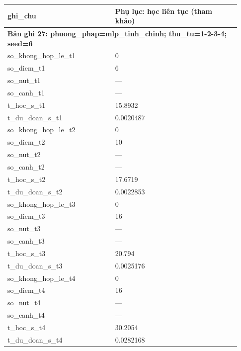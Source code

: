 \begin{longtable}{p{0.43\linewidth}p{0.50\linewidth}}
ghi\_\allowbreak chu & Phụ lục: học liên tục (tham khảo) \\
\midrule
\multicolumn{2}{p{0.95\linewidth}}{\textbf{Bản ghi 27: phuong\_phap=mlp\_tinh\_chinh; thu\_tu=1-2-3-4; seed=6}} \\
so\_\allowbreak khong\_\allowbreak hop\_\allowbreak le\_\allowbreak t1 & 0 \\
so\_\allowbreak diem\_\allowbreak t1 & 6 \\
so\_\allowbreak nut\_\allowbreak t1 & — \\
so\_\allowbreak canh\_\allowbreak t1 & — \\
t\_\allowbreak hoc\_\allowbreak s\_\allowbreak t1 & 15.8932 \\
t\_\allowbreak du\_\allowbreak doan\_\allowbreak s\_\allowbreak t1 & 0.0020487 \\
so\_\allowbreak khong\_\allowbreak hop\_\allowbreak le\_\allowbreak t2 & 0 \\
so\_\allowbreak diem\_\allowbreak t2 & 10 \\
so\_\allowbreak nut\_\allowbreak t2 & — \\
so\_\allowbreak canh\_\allowbreak t2 & — \\
t\_\allowbreak hoc\_\allowbreak s\_\allowbreak t2 & 17.6719 \\
t\_\allowbreak du\_\allowbreak doan\_\allowbreak s\_\allowbreak t2 & 0.0022853 \\
so\_\allowbreak khong\_\allowbreak hop\_\allowbreak le\_\allowbreak t3 & 0 \\
so\_\allowbreak diem\_\allowbreak t3 & 16 \\
so\_\allowbreak nut\_\allowbreak t3 & — \\
so\_\allowbreak canh\_\allowbreak t3 & — \\
t\_\allowbreak hoc\_\allowbreak s\_\allowbreak t3 & 20.794 \\
t\_\allowbreak du\_\allowbreak doan\_\allowbreak s\_\allowbreak t3 & 0.0025176 \\
so\_\allowbreak khong\_\allowbreak hop\_\allowbreak le\_\allowbreak t4 & 0 \\
so\_\allowbreak diem\_\allowbreak t4 & 16 \\
so\_\allowbreak nut\_\allowbreak t4 & — \\
so\_\allowbreak canh\_\allowbreak t4 & — \\
t\_\allowbreak hoc\_\allowbreak s\_\allowbreak t4 & 30.2054 \\
t\_\allowbreak du\_\allowbreak doan\_\allowbreak s\_\allowbreak t4 & 0.0282168 \\

\end{longtable}
